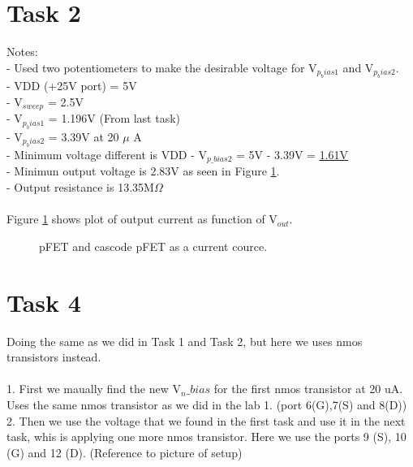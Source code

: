 \documentclass[a4paper,english,11pt]{article}
\begin{document}
\section{Task 2}
Notes:\\
- Used two potentiometers to make the desirable voltage for V$_{p_bias1}$ and V$_{p_bias2}$.\\
- VDD (+25V port) = 5V\\
- V$_{sweep}$ = 2.5V\\
- V$_{p_bias1}$ = 1.196V (From last task)\\
- V$_{p_bias2}$ = 3.39V at 20 $\mu$ A\\
- Minimum voltage different is VDD - V$_{p\_bias2}$ = 5V - 3.39V = \underline{\underline{1.61V}}\\
- Minimun output voltage is 2.83V as seen in Figure \ref{fig:pfet-cascode-pfet}.\\
- Output resistance is 13.35M$\Omega$\\
\\
Figure \ref{fig:pfet-cascode-pfet} shows plot of output current as function of V$_{out}$.
\begin{figure}[htbp]
 \centering
  \caption{pFET and cascode pFET as a current cource.}
  \label{fig:pfet-cascode-pfet}	
\end{figure}

\newpage
\section{Task 4}
Doing the same as we did in Task 1 and Task 2, but here we uses nmos transistors instead.\\
\\
1. First we maually find the new V$_n\_bias$ for the first nmos transistor at 20 uA.\\
Uses the same nmos transistor as we did in the lab 1. (port 6(G),7(S) and 8(D))\\
2. Then we use the voltage that we found in the first task and use it in the next task, whis is applying one more nmos transistor. Here we
use the ports 9 (S), 10 (G) and 12 (D). (Reference to picture of setup)
\end{document}
